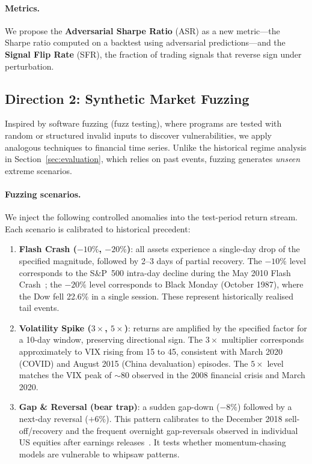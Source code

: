 \documentclass[preprint,review,12pt]{elsarticle}
\begin{document}
\paragraph{Metrics.}
We propose the \textbf{Adversarial Sharpe Ratio} (ASR) as a new metric---the Sharpe ratio computed on a backtest using adversarial predictions---and the \textbf{Signal Flip Rate} (SFR), the fraction of trading signals that reverse sign under perturbation.

\subsection{Direction 2: Synthetic Market Fuzzing}
\label{sec:fuzz_method}

Inspired by software fuzzing (fuzz testing), where programs are tested with random or structured invalid inputs to discover vulnerabilities, we apply analogous techniques to financial time series.
Unlike the historical regime analysis in Section~\ref{sec:evaluation}, which relies on past events, fuzzing generates \emph{unseen} extreme scenarios.

\paragraph{Fuzzing scenarios.}
We inject the following controlled anomalies into the test-period return stream.
Each scenario is calibrated to historical precedent:
\begin{enumerate}[leftmargin=1.6em]
  \item \textbf{Flash Crash ($-10\%$, $-20\%$)}: all assets experience a single-day drop of the specified magnitude, followed by 2--3 days of partial recovery. The $-10\%$ level corresponds to the S\&P~500 intra-day decline during the May 2010 Flash Crash~\citep{ref_kirilenko2017}; the $-20\%$ level corresponds to Black Monday (October 1987), where the Dow fell 22.6\% in a single session. These represent historically realised tail events.
  \item \textbf{Volatility Spike ($3\times$, $5\times$)}: returns are amplified by the specified factor for a 10-day window, preserving directional sign. The $3\times$ multiplier corresponds approximately to VIX rising from 15 to 45, consistent with March 2020 (COVID) and August 2015 (China devaluation) episodes. The $5\times$ level matches the VIX peak of $\sim$80 observed in the 2008 financial crisis and March 2020.
  \item \textbf{Gap \& Reversal (bear trap)}: a sudden gap-down ($-8\%$) followed by a next-day reversal ($+6\%$). This pattern calibrates to the December 2018 sell-off/recovery and the frequent overnight gap-reversals observed in individual US equities after earnings releases~\citep{ref42}. It tests whether momentum-chasing models are vulnerable to whipsaw patterns.
\end{enumerate}
\end{document}
